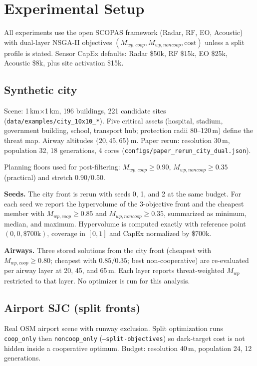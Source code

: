 
\section{Experimental Setup}
\label{sec:setup}

All experiments use the open SCOPAS framework (Radar, RF, EO, Acoustic) with dual-layer NSGA-II objectives \((M_{wp,coop}, M_{wp,noncoop}, \mathrm{cost})\) unless a split profile is stated. Sensor CapEx defaults: Radar \$50k, RF \$15k, EO \$25k, Acoustic \$8k, plus site activation \$15k.

\subsection{Synthetic city}

Scene: 1\,km$\times$1\,km, 196 buildings, 221 candidate sites (\texttt{data/examples/city\_10x10\_*}). Five critical assets (hospital, stadium, government building, school, transport hub; protection radii 80--120\,m) define the threat map. Airway altitudes \(\{20,45,65\}\)\,m. Paper rerun: resolution 30\,m, population 32, 18 generations, 4 cores (\texttt{configs/paper\_rerun\_city\_dual.json}).

Planning floors used for post-filtering: \(M_{wp,coop}\geq0.90\), \(M_{wp,noncoop}\geq0.35\) (practical) and stretch \(0.90/0.50\).

\textbf{Seeds.} The city front is rerun with seeds 0, 1, and 2 at the same budget. For each seed we report the hypervolume of the 3-objective front and the cheapest member with \(M_{wp,coop}\geq0.85\) and \(M_{wp,noncoop}\geq0.35\), summarized as minimum, median, and maximum. Hypervolume is computed exactly with reference point \((0,0,\$700\mathrm{k})\), coverage in \([0,1]\) and CapEx normalized by \$700k.

\textbf{Airways.} Three stored solutions from the city front (cheapest with \(M_{wp,coop}\geq0.80\); cheapest with \(0.85/0.35\); best non-cooperative) are re-evaluated per airway layer at 20, 45, and 65\,m. Each layer reports threat-weighted \(M_{wp}\) restricted to that layer. No optimizer is run for this analysis.

\subsection{Airport SJC (split fronts)}

Real OSM airport scene with runway exclusion. Split optimization runs \texttt{coop\_only} then \texttt{noncoop\_only} (\texttt{--split-objectives}) so dark-target cost is not hidden inside a cooperative optimum. Budget: resolution 40\,m, population 24, 12 generations.

